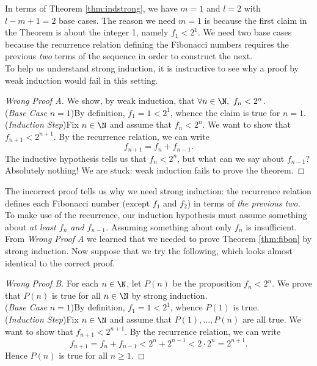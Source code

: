 \noindent In terms of Theorem \ref{thm:indstrong}, we have $m=1$ and $l=2$ with $l-m+1=2$ base cases. The reason we need $m=1$ is because the first claim in the Theorem is about the integer 1, namely $f_1<2^1$. We need two base cases because the recurrence relation defining the Fibonacci numbers requires the previous \emph{two} terms of the sequence in order to construct the next.\\

To help us understand strong induction, it is instructive to see why a proof by weak induction would fail in this setting.

\begin{proof}[Wrong Proof A]
We show, by weak induction, that $\forall n\in\N,\ f_n<2^n$.\\[2pt]
(\emph{Base Case} $n=1$)\quad By definition, $f_1=1<2^1$, whence the claim is true for $n=1$.\\[2pt]
(\emph{Induction Step})\quad Fix $n\in\N$ and assume that $f_n<2^n$. We want to show that $f_{n+1}<2^{n+1}$. By the recurrence relation, we can write
\[f_{n+1}=f_n+f_{n-1}.\tag*{($\ast$)}\]
The inductive hypothesis tells us that $f_n<2^n$, but what can we say about $f_{n-1}$? Absolutely nothing! We are stuck: weak induction fails to prove the theorem.
\end{proof}

\noindent The incorrect proof tells us why we need strong induction: the recurrence relation defines each Fibonacci number (except $f_1$ and $f_2$) in terms of \emph{the previous two.} To make use of the recurrence, our induction hypothesis must assume something about \emph{at least $f_n$ and $f_{n-1}$.} Assuming something about only $f_n$ is insufficient.\\

\noindent From \emph{Wrong Proof A} we learned that we needed to prove Theorem \ref{thm:fibon} by strong induction. Now suppose that we try the following, which looks almost identical to the correct proof.

\begin{proof}[Wrong Proof B]
For each $n\in\N$, let $P(n)$ be the proposition $f_n<2^n$. We prove that $P(n)$ is true for all $n\in\N$ by strong induction.\\[2pt]
(\emph{Base Case} $n=1$)\quad By definition, $f_1=1<2^1$, whence $P(1)$ is true.\\[2pt]
(\emph{Induction Step})\quad Fix $n\in\N$ and assume that $P(1),\ldots,P(n)$ are all true. We want to show that $f_{n+1}<2^{n+1}$. By the recurrence relation, we can write
\[f_{n+1}=f_n+f_{n-1}<2^n+2^{n-1}<2\cdot 2^n=2^{n+1}.\tag*{($\dag$)}\]
Hence $P(n)$ is true for all $n\ge 1$.
\end{proof}


